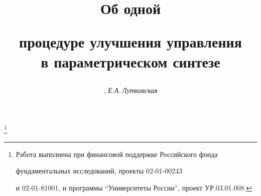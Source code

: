 




%





\newcommand{\la}{\langle}


\newcommand{\ra}{\rangle}


\newcommand{\mes}{\operatorname{mes}}


\newcommand{\vraisup}{\operatornamewithlimits{vrai~sup}}


\newcommand{\tts}[1]{}







\setcounter{page}{39}















\author{, \it Е.А.\,Лутковская}




\title{Об одной 


процедуре улучшения управления\\ в параметрическом синтезе}


\thanks{Работа выполнена при финансовой поддержке Российского фонда 


фундаментальных исследований, проекты 02-01-00243


и 02-01-81001, и программы ``Университеты России'', проект УР.03.01.008.}





\date{}




